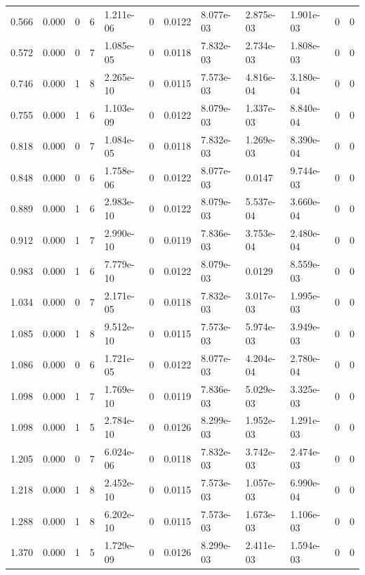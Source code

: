 \documentclass[preview]{standalone}
\begin{document}
{{\begin{tabular}{L{1.2cm}C{1.2cm} C{0.3cm}C{0.5cm} C{1.4cm}C{1.4cm} C{1.4cm}C{1.4cm} C{1.6cm}C{1.6cm} C{1.6cm}C{1.6cm}}
  0.566  &  0.000  & 0     &  6 &  1.211e-06  & 0  &  0.0122&   8.077e-03& 2.875e-03 & 1.901e-03   &  0 & 0  \\ 
  0.572  &  0.000  & 0     &  7 &  1.085e-05  & 0  &  0.0118&   7.832e-03& 2.734e-03 & 1.808e-03   &  0 & 0  \\ 
  0.746  &  0.000  & 1     &  8 &  2.265e-10  & 0  &  0.0115&   7.573e-03& 4.816e-04 & 3.180e-04   &  0 & 0  \\ 
  0.755  &  0.000  & 1     &  6 &  1.103e-09  & 0  &  0.0122&   8.079e-03& 1.337e-03 & 8.840e-04   &  0 & 0  \\ 
  0.818  &  0.000  & 0     &  7 &  1.084e-05  & 0  &  0.0118&   7.832e-03& 1.269e-03 & 8.390e-04   &  0 & 0  \\ 
  0.848  &  0.000  & 0     &  6 &  1.758e-06  & 0  &  0.0122&   8.077e-03& 0.0147 & 9.744e-03   &  0 & 0  \\ 
  0.889  &  0.000  & 1     &  6 &  2.983e-10  & 0  &  0.0122&   8.079e-03& 5.537e-04 & 3.660e-04   &  0 & 0  \\ 
  0.912  &  0.000  & 1     &  7 &  2.990e-10  & 0  &  0.0119&   7.836e-03& 3.753e-04 & 2.480e-04   &  0 & 0  \\ 
  0.983  &  0.000  & 1     &  6 &  7.779e-10  & 0  &  0.0122&   8.079e-03& 0.0129 & 8.559e-03   &  0 & 0  \\ 
  1.034  &  0.000  & 0     &  7 &  2.171e-05  & 0  &  0.0118&   7.832e-03& 3.017e-03 & 1.995e-03   &  0 & 0  \\ 
  1.085  &  0.000  & 1     &  8 &  9.512e-10  & 0  &  0.0115&   7.573e-03& 5.974e-03 & 3.949e-03   &  0 & 0  \\ 
  1.086  &  0.000  & 0     &  6 &  1.721e-05  & 0  &  0.0122&   8.077e-03& 4.204e-04 & 2.780e-04   &  0 & 0  \\ 
  1.098  &  0.000  & 1     &  7 &  1.769e-10  & 0  &  0.0119&   7.836e-03& 5.029e-03 & 3.325e-03   &  0 & 0  \\ 
  1.098  &  0.000  & 1     &  5 &  2.784e-10  & 0  &  0.0126&   8.299e-03& 1.952e-03 & 1.291e-03   &  0 & 0  \\ 
  1.205  &  0.000  & 0     &  7 &  6.024e-06  & 0  &  0.0118&   7.832e-03& 3.742e-03 & 2.474e-03   &  0 & 0  \\ 
  1.218  &  0.000  & 1     &  8 &  2.452e-10  & 0  &  0.0115&   7.573e-03& 1.057e-03 & 6.990e-04   &  0 & 0  \\ 
  1.288  &  0.000  & 1     &  8 &  6.202e-10  & 0  &  0.0115&   7.573e-03& 1.673e-03 & 1.106e-03   &  0 & 0  \\ 
  1.370  &  0.000  & 1     &  5 &  1.729e-09  & 0  &  0.0126&   8.299e-03& 2.411e-03 & 1.594e-03   &  0 & 0  \\ 

\end{tabular}}}
\end{document}
